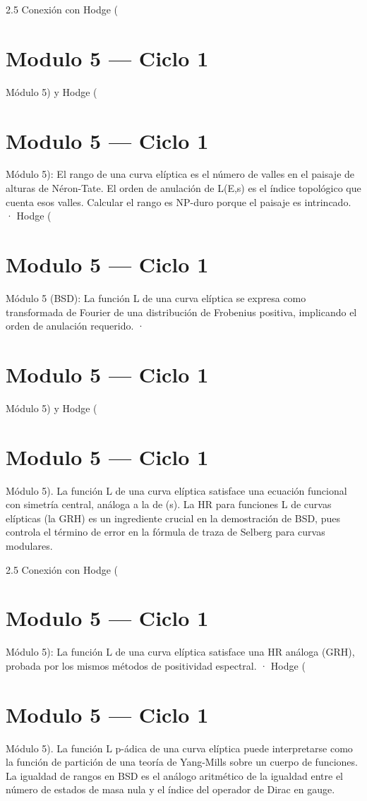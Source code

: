 \documentclass[12pt,twoside]{book}
\begin{document}
2.5 Conexión con Hodge (

\chapter{Modulo 5 — Ciclo 1}
Módulo 5) y Hodge (

\chapter{Modulo 5 — Ciclo 1}
Módulo 5): El rango de una curva elíptica es el número de valles en el paisaje de alturas de Néron-Tate. El orden de anulación de L(E,s) es el índice topológico que cuenta esos valles. Calcular el rango es NP-duro porque el paisaje es intrincado.
· Hodge (

\chapter{Modulo 5 — Ciclo 1}
Módulo 5 (BSD): La función L de una curva elíptica se expresa como transformada de Fourier de una distribución de Frobenius positiva, implicando el orden de anulación requerido.
· 

\chapter{Modulo 5 — Ciclo 1}
Módulo 5) y Hodge (

\chapter{Modulo 5 — Ciclo 1}
Módulo 5).
La función L de una curva elíptica satisface una ecuación funcional con simetría central, análoga a la de \zeta(s). La HR para funciones L de curvas elípticas (la GRH) es un ingrediente crucial en la demostración de BSD, pues controla el término de error en la fórmula de traza de Selberg para curvas modulares.

2.5 Conexión con Hodge (

\chapter{Modulo 5 — Ciclo 1}
Módulo 5): La función L de una curva elíptica satisface una HR análoga (GRH), probada por los mismos métodos de positividad espectral.
· Hodge (

\chapter{Modulo 5 — Ciclo 1}
Módulo 5).
La función L p-ádica de una curva elíptica puede interpretarse como la función de partición de una teoría de Yang-Mills sobre un cuerpo de funciones. La igualdad de rangos en BSD es el análogo aritmético de la igualdad entre el número de estados de masa nula y el índice del operador de Dirac en gauge.
\end{document}

